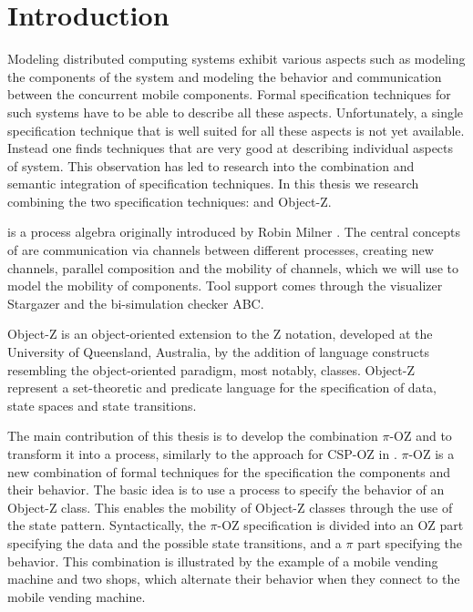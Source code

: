 \chapter{Introduction}
\pagestyle{scrheadings}	
\setcounter{page}{0}
\label{chp_introduction}
Modeling distributed computing systems exhibit various aspects such as modeling the components of the system and modeling the behavior and communication between the concurrent mobile components. Formal specification techniques for such systems have to be able to describe all these aspects. Unfortunately, a single specification technique that is well suited for all these aspects is not yet available. Instead one finds techniques that are very good at describing individual aspects of system. This observation has led to research into the combination and semantic integration of specification techniques. In this thesis we research combining the two specification techniques:
\picalc{} and Object-Z.

\picalc{} is a process algebra originally introduced by Robin Milner \cite{milner}. The central concepts of \picalc{} are communication via channels between different processes, creating new channels, parallel composition and the mobility of channels, which we will use to model the mobility of components. Tool support comes through the \picalc{} visualizer Stargazer and the bi-simulation checker ABC.

Object-Z is an object-oriented extension to the Z notation, developed at the University of Queensland, Australia, by the addition of language constructs resembling the object-oriented paradigm, most notably, classes. Object-Z represent a set-theoretic and predicate language for the specification of data, state spaces and state transitions.

The main contribution of this thesis is to develop the combination $\pi$-OZ and to transform it into a \picalc{} process, similarly to the approach for CSP-OZ in \cite{olderog}. $\pi$-OZ is a new combination of formal techniques
for the specification the components and their behavior. The basic idea is to use a \picalc{} process to specify the behavior of an Object-Z class. This enables the mobility of Object-Z classes through the use of the state pattern. Syntactically, the $\pi$-OZ specification is divided into an OZ part specifying the data and the possible state transitions, and a $\pi$ part specifying the behavior.  This combination is illustrated by the example of a mobile vending machine and two shops, which alternate their behavior when they connect to the mobile vending machine.

